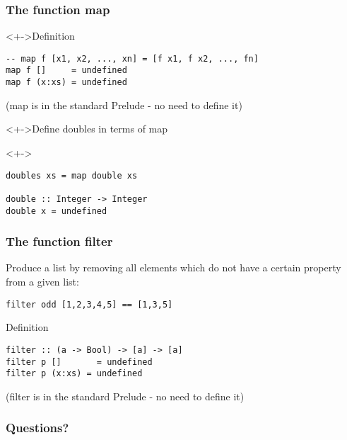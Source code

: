 \documentclass{beamer}
\begin{document}
\begin{frame}[fragile]
  \frametitle{The function map}
  \begin{block}<+->{Definition}
\begin{verbatim}
-- map f [x1, x2, ..., xn] = [f x1, f x2, ..., fn]
map f []     = undefined
map f (x:xs) = undefined
\end{verbatim}
    (map is in the standard Prelude - no need to define it)
  \end{block}
  \begin{alertblock}<+->{Define doubles in terms of map}
  \end{alertblock}
  \begin{block}<+->{}
\begin{verbatim}
doubles xs = map double xs

double :: Integer -> Integer
double x = undefined
\end{verbatim}
  \end{block}
\end{frame}
\begin{frame}[fragile]
  \frametitle{The function filter}
  Produce a list by removing all elements 
  which do not have a certain property from 
  a given list: 

\begin{verbatim}
filter odd [1,2,3,4,5] == [1,3,5]
\end{verbatim}

  \begin{block}{Definition}
\begin{verbatim}
filter :: (a -> Bool) -> [a] -> [a]
filter p []       = undefined
filter p (x:xs) = undefined
\end{verbatim}
(filter is in the standard Prelude - no need to define it)
  \end{block}
\end{frame}

\begin{frame}
  \frametitle{Questions?}
  \begin{center}
  \end{center}
\end{frame}
\end{document}
